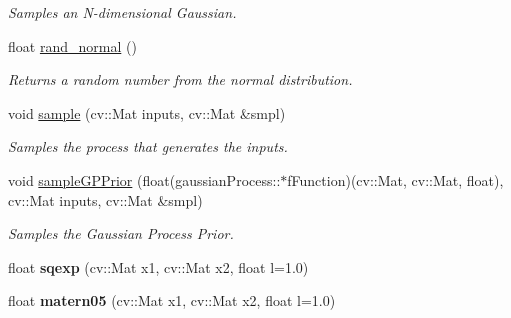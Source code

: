 \begin{DoxyCompactItemize}
\begin{DoxyCompactList}\small\item\em Samples an N-\/dimensional Gaussian. \item\end{DoxyCompactList}\item 
\hypertarget{classgaussianProcess_a5b5b0c77bb2f450bce70777573f7ca90}{
float \hyperlink{classgaussianProcess_a5b5b0c77bb2f450bce70777573f7ca90}{rand\_\-normal} ()}
\label{classgaussianProcess_a5b5b0c77bb2f450bce70777573f7ca90}

\begin{DoxyCompactList}\small\item\em Returns a random number from the normal distribution. \item\end{DoxyCompactList}\item 
\hypertarget{classgaussianProcess_a9e954c4e8d9ad3975b3350909c22103b}{
void \hyperlink{classgaussianProcess_a9e954c4e8d9ad3975b3350909c22103b}{sample} (cv::Mat inputs, cv::Mat \&smpl)}
\label{classgaussianProcess_a9e954c4e8d9ad3975b3350909c22103b}

\begin{DoxyCompactList}\small\item\em Samples the process that generates the inputs. \item\end{DoxyCompactList}\item 
\hypertarget{classgaussianProcess_ad88d150676e5f6fcb5b315f358f3fb86}{
void \hyperlink{classgaussianProcess_ad88d150676e5f6fcb5b315f358f3fb86}{sampleGPPrior} (float(gaussianProcess::$\ast$fFunction)(cv::Mat, cv::Mat, float), cv::Mat inputs, cv::Mat \&smpl)}
\label{classgaussianProcess_ad88d150676e5f6fcb5b315f358f3fb86}

\begin{DoxyCompactList}\small\item\em Samples the Gaussian Process Prior. \item\end{DoxyCompactList}\item 
\hypertarget{classgaussianProcess_ad442534cd5ea58b07992d15710ac0135}{
float {\bfseries sqexp} (cv::Mat x1, cv::Mat x2, float l=1.0)}
\label{classgaussianProcess_ad442534cd5ea58b07992d15710ac0135}

\item 
\hypertarget{classgaussianProcess_a38d17d63943369b59dec32fe5bc78037}{
float {\bfseries matern05} (cv::Mat x1, cv::Mat x2, float l=1.0)}
\label{classgaussianProcess_a38d17d63943369b59dec32fe5bc78037}


\end{DoxyCompactItemize}
